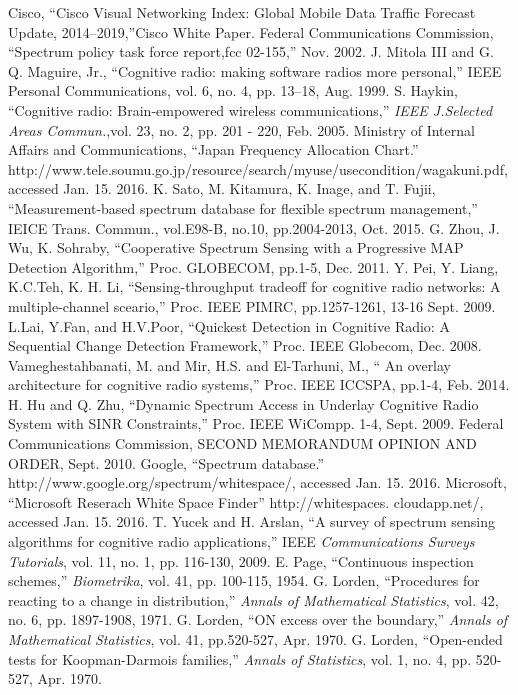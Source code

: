 \begin{thebibliography}{99}
Cisco, ``Cisco Visual Networking Index: Global Mobile Data Traffic Forecast Update, 2014–2019,''Cisco White Paper.
Federal Communications Commission, ``Spectrum policy task force report,fcc 02-155,'' Nov. 2002.
J. Mitola III and G. Q. Maguire, Jr., ``Cognitive radio: making software radios more personal,'' IEEE Personal Communications, vol. 6, no. 4, pp. 13–18, Aug. 1999.
 S. Haykin, ``Cognitive radio: Brain-empowered wireless communications,'' {\it IEEE J.Selected Areas Commun.},vol. 23, no. 2, pp. 201 - 220, Feb. 2005.
 Ministry of Internal Affairs and Communications, ``Japan Frequency Allocation Chart.'' http://www.tele.soumu.go.jp/resource/search/myuse/usecondition/wagakuni.pdf, accessed Jan. 15. 2016.
 K. Sato, M. Kitamura, K. Inage, and T. Fujii, ``Measurement-based spectrum database for flexible spectrum management,'' IEICE Trans. Commun., vol.E98-B, no.10, pp.2004-2013, Oct. 2015.
G. Zhou, J. Wu, K. Sohraby, ``Cooperative Spectrum Sensing with a Progressive MAP Detection Algorithm,'' Proc. GLOBECOM, pp.1-5, Dec. 2011.
Y. Pei, Y. Liang, K.C.Teh, K. H. Li, ``Sensing-throughput tradeoff for cognitive radio networks: A multiple-channel sceario,'' Proc. IEEE PIMRC, pp.1257-1261, 13-16 Sept. 2009.
L.Lai, Y.Fan, and H.V.Poor, ``Quickest Detection in Cognitive Radio: A Sequential Change Detection Framework,'' Proc. IEEE Globecom, Dec. 2008.
Vameghestahbanati, M. and Mir, H.S. and El-Tarhuni, M., `` An overlay architecture for cognitive radio systems,'' Proc. IEEE ICCSPA, pp.1-4, Feb. 2014.
H. Hu and Q. Zhu, ``Dynamic Spectrum Access in Underlay Cognitive Radio System with SINR Constraints,'' Proc. IEEE WiCompp. 1-4, Sept. 2009.
Federal Communications Commission, SECOND MEMORANDUM OPINION AND ORDER, Sept. 2010.
Google, ``Spectrum database.'' http://www.google.org/spectrum/whitespace/, accessed Jan. 15. 2016.
Microsoft, ``Microsoft Reserach White Space Finder'' http://whitespaces. cloudapp.net/, accessed Jan. 15. 2016.
T. Yucek and H. Arslan, ``A survey of spectrum sensing algorithms for cognitive radio applications,'' IEEE {\it Communications Surveys Tutorials}, vol. 11, no. 1, pp. 116-130, 2009.
E. Page, ``Continuous inspection schemes,'' {\it Biometrika}, vol. 41, pp. 100-115, 1954.
G. Lorden, ``Procedures for reacting to a change in distribution,'' {\it Annals of Mathematical Statistics}, vol. 42, no. 6, pp. 1897-1908, 1971.  
G. Lorden, ``ON excess over the boundary,'' {\it Annals of Mathematical Statistics}, vol. 41, pp.520-527, Apr. 1970.
G. Lorden, ``Open-ended tests for Koopman-Darmois families,'' {\it Annals of Statistics}, vol. 1, no. 4, pp. 520-527, Apr. 1970.
\end{thebibliography}

